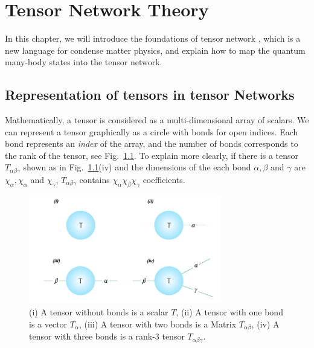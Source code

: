 \chapter{Tensor Network Theory} 
\label{chap2}
In this chapter, we will introduce the foundations of tensor network \cite{jordan_studies_2011,Orus2014117,bauer_tensor_2011}, which is a new language for condense matter physics, and explain how to map the quantum many-body states into the tensor network. 

\section{Representation of tensors in tensor Networks}
\label{notations}

Mathematically, a tensor is considered as a multi-dimensional array of scalars. We can represent a tensor graphically as a circle with bonds for open indices. Each bond represents an \textit{index} of the array, and the number of bonds corresponds to the rank of the tensor, see Fig.~\ref{fig211}. To explain more clearly, if there is a tensor $T_{\alpha \beta \gamma}$ shown as in Fig.~\ref{fig211}(iv) and the dimensions of the each bond $\alpha, \beta$ and $\gamma$ are $\chi_{\alpha},\chi_{\alpha}$ and $\chi_{\gamma}$, $T_{\alpha \beta \gamma}$ contains $\chi_{\alpha}\chi_{\beta}\chi_{\gamma}$ coefficients.


\begin{figure}[ht]
	\centering
	\includegraphics[width=0.75\textwidth]{figures/fig211.png}
	\caption[The reprecentation of commen tensors.]{(i) A tensor without bonds is a scalar $T$, (ii) A tensor with one bond is a vector $T_{\alpha}$, (iii) A tensor with two bonds is a Matrix $T_{\alpha \beta}$, (iv) A tensor with three bonds is a rank-3 tensor $T_{\alpha \beta \gamma}$.}
	\label{fig211}
\end{figure}

